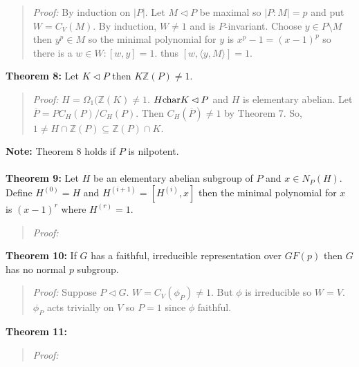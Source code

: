 \begin{quote}
\emph{Proof:}
By induction on $|P|$.  Let $M \lhd P$ be maximal so $|P:M|=p$ and put $W=C_V(M)$.
By induction, $W \ne 1$ and is $P$-invariant.  Choose $y \in P \setminus M$ then
$y^p \in M$ so the minimal polynomial for $y$ is $x^p-1 = (x-1)^p$ so there is a $w \in W: [w,y]=1$.
thus $[w, \langle y, M \rangle ] = 1$.
\end{quote}
{\bf Theorem 8:} Let $K \lhd P$ then $K {\mathbb Z}(P) \ne 1$.
\begin{quote}
\emph{Proof:}
$H= \Omega_1({\mathbb Z}(K) \ne 1$.  $H \textnormal{char} K \lhd P$ and $H$ is elementary
abelian. Let ${\overline P} = P C_H(P) / C_H(P)$.  Then $C_H({\overline P}) \ne 1$ by Theorem 7.
So, $1 \ne H \cap {\mathbb Z}(P) \subseteq {\mathbb Z}(P) \cap K$.
\end{quote}
{\bf Note:} Theorem 8 holds if $P$ is nilpotent.
\\
\\
{\bf Theorem 9:}  Let $H$ be an elementary abelian subgroup of $P$ and $x \in N_P(H)$.  Define
$H^{(0)} = H$ and $H^{(i+1)}= [H^{(i)}, x]$ then the minimal polynomial for $x$ is $(x-1)^r$
where $H^{(r)}=1$.
\begin{quote}
\emph{Proof:}
\end{quote}
{\bf Theorem 10:} If $G$ has a faithful, irreducible representation over $GF(p)$ then $G$
has no normal $p$ subgroup.
\begin{quote}
\emph{Proof:}
Suppose $P \lhd G$.  $W= C_V(\phi_{P}) \ne 1$.  But $\phi$ is irreducible so $W=V$.  $\phi_{P}$
acts trivially on $V$ so $P=1$ since $\phi$ faithful.
\end{quote}
{\bf Theorem 11:}
\begin{quote}
\emph{Proof:}
\end{quote}

